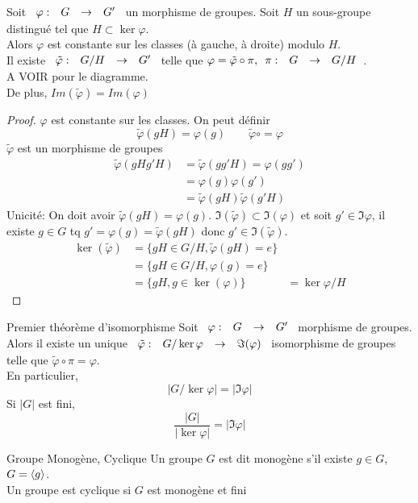 \documentclass[]{report}
\begin{document}
\begin{prop}{}{}
    Soit $\begin{array}{ccccc} \varphi : & G & \to & G' \end{array}$ un morphisme de groupes. Soit $H$ un sous-groupe distingué tel que $H\subset \ker \varphi$.\\
    Alors $\varphi$ est constante sur les classes (à gauche, à droite) modulo $H$.\\
    Il existe $\begin{array}{ccccc} \tilde{\varphi} : & G/H & \to & G' \end{array}$ telle que $\varphi=\tilde{\varphi}\circ \pi,\begin{array}{ccccc} \pi : & G & \to & G/H \end{array}$.\\
    A VOIR pour le diagramme.\\
    De plus, $Im(\tilde{\varphi})=Im(\varphi)$
\end{prop}

\begin{proof}{}{}
    $\varphi$ est constante sur les classes. On peut définir
    \[\tilde{\varphi}(gH)=\varphi(g)\qquad \tilde{\varphi}\circ=\varphi\]
    $\tilde{\varphi}$ est un morphisme de groupes
    \begin{align*}
        \tilde{\varphi}(gHg'H)&=\tilde{\varphi}(gg'H)=\varphi(gg')\\
        &=\varphi(g)\varphi(g')\\
        &=\tilde{\varphi}(gH)\tilde{\varphi}(g'H)
    \end{align*}
    Unicité: On doit avoir $\tilde{\varphi}(gH)=\varphi(g)$. $\Im(\tilde{\varphi})\subset\Im (\varphi)$ et soit $g'\in \Im\varphi$, il existe $g\in G$ tq $g'=\varphi(g)=\tilde{\varphi}(gH)$ donc $g'\in \Im (\tilde{\varphi})$.
    \begin{align*}
        \ker (\tilde{\varphi})&=\{gH\in G/H,\tilde{\varphi}(gH)=e\}\\
        &=\{gH\in G/H,\varphi(g)=e\}\\
        &=\{gH,g\in \ker (\varphi)\}
        &=\ker \varphi/H
    \end{align*}
\end{proof}

\begin{cor}{Premier théorème d'isomorphisme}{}
    Soit $\begin{array}{ccccc} \varphi : & G & \to & G' \end{array}$ morphisme de groupes. Alors il existe un unique $\begin{array}{ccccc} \tilde{\varphi} : & G/\ker\varphi & \to & \Im(\varphi) \end{array}$ isomorphisme de groupes telle que $\tilde{\varphi}\circ \pi=\varphi$.\\
    En particulier,
    \[\left|G/\ker \varphi\right|=\left|\Im \varphi\right|\]
    Si $|G|$ est fini,
    \[\frac{|G|}{\left|\ker \varphi\right|}=\left|\Im \varphi\right|\]
\end{cor}

\begin{df}{Groupe Monogène, Cyclique}{}
    Un groupe $G$ est dit monogène s'il existe $g\in G$, $G=\langle g \rangle$.\\
    Un groupe est cyclique si $G$ est monogène et fini
\end{df}
\end{document}
